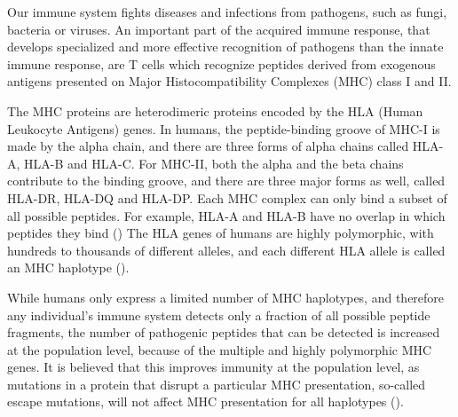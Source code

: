 Our immune system fights diseases and infections from pathogens, 
such as fungi, bacteria or viruses. 
An important part of the acquired immune response, 
that develops specialized and more effective recognition of pathogens than the innate immune response, 
are T cells which recognize peptides derived from 
exogenous antigens presented on Major Histocompatibility Complexes (MHC) class I and II. 



The MHC proteins are heterodimeric proteins encoded by the
HLA (Human Leukocyte Antigens) genes.
In humans, the peptide-binding groove of MHC-I is made by the alpha chain, and there are three forms of alpha chains called HLA-A, HLA-B and HLA-C. 
For MHC-II, both the alpha and the beta chains contribute to the binding groove, and there are three major forms as well, called HLA-DR, HLA-DQ and HLA-DP.
Each MHC complex can only bind a subset of all possible peptides.
For example, HLA-A and HLA-B have no overlap in which
peptides they bind (\cite{lund2004definition})
The HLA genes of humans are highly polymorphic, with hundreds 
to thousands of different alleles, 
and each different HLA allele is called 
an MHC haplotype (\cite{marsh2010nomenclature}).


While humans only express a limited number of MHC haplotypes, and therefore any individual's immune system detects only a fraction of all possible
peptide fragments, the number of pathogenic peptides that can be detected is increased at the population level, because of the multiple and highly polymorphic MHC genes.
It is believed that this improves immunity at the population level, 
as mutations in a protein that disrupt a particular MHC presentation, 
so-called escape mutations, 
will not affect MHC presentation for all haplotypes (\cite{sommer2005importance}).


